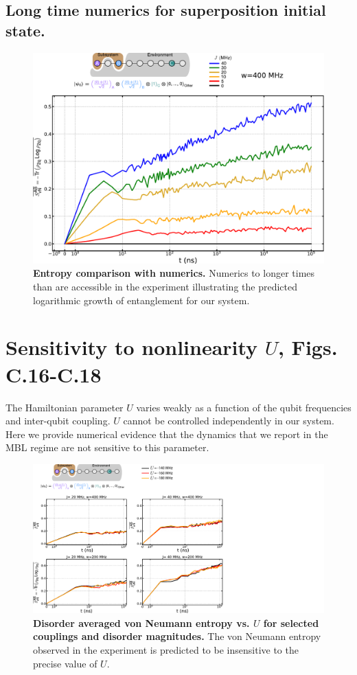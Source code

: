 \subsection{Long time numerics for superposition initial state.}
\begin{figure}
\centering
\includegraphics[width=140mm, keepaspectratio]{./PDF/num_svn_long_time.pdf}
\caption{\textbf{Entropy comparison with numerics.}
Numerics to longer times than are accessible in the experiment illustrating the predicted logarithmic growth of entanglement for our system.
}
\label{long_time_numerics}
\end{figure}

\section{Sensitivity to nonlinearity $U$, Figs.\,C.16-C.18}
The Hamiltonian parameter $U$ varies weakly as a function of the qubit frequencies and inter-qubit coupling.
$U$ cannot be controlled independently in our system.
Here we provide numerical evidence that the dynamics that we report in the MBL regime are not sensitive to this parameter.
\begin{figure}
\centering
\hspace*{20 mm}
\includegraphics[width=200mm, keepaspectratio]{./PDF/eta_svn.pdf}
\caption{\textbf{Disorder averaged von Neumann entropy vs. $U$ for selected couplings and disorder magnitudes.}  The von Neumann entropy observed in the experiment is predicted to be insensitive to the precise value of $U$.}
\end{figure}

